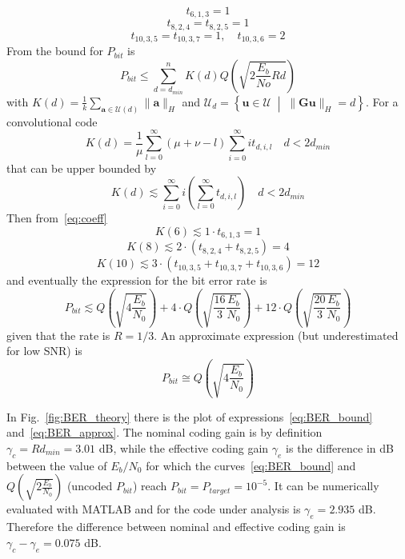 \documentclass[10pt]{article}
\begin{document}
\begin{equation*}
	t_{6,1,3} = 1
\end{equation*}
\begin{equation}\label{eq:coeff}
	t_{8,2,4} = t_{8,2,5} = 1
\end{equation}
\begin{equation*}
	t_{10, 3, 5} = t_{10, 3, 7} = 1, \quad  t_{10,3,6} = 2
\end{equation*}
From \cite{erseghe} the bound for $P_{bit}$ is
\begin{equation}
	P_{bit} \le \sum_{d=d_{min}}^n K(d)Q\left(\sqrt{2\frac{E_b}{No}Rd}\right)
\end{equation}
with $K(d) = \frac{1}{k} \sum_{\mathbf{a}\in\mathcal{U}(d)} \|\mathbf{a}\|_H$ and $\mathcal{U}_d = \left\{ \mathbf{u} \in \mathcal{U} \; \middle| \; \|\mathbf{Gu} \|_{H} = d \right\}$. For a convolutional code 
\begin{equation}
	K(d) = \frac{1}{\mu}\sum_{l=0}^{\infty} (\mu + \nu - l) \sum_{i=0}^{\infty} i t_{d,i,l} \quad d < 2d_{min}
\end{equation}
that can be upper bounded by
\begin{equation}
	K(d) \lesssim \sum_{i=0}^{\infty} i \left( \sum_{l=0}^{\infty}t_{d,i,l}\right) \quad d < 2d_{min}
\end{equation}
Then from~\eqref{eq:coeff} 
\begin{equation*}
	K(6) \lesssim 1\cdot t_{6,1,3} = 1
\end{equation*}
\begin{equation}
	K(8) \lesssim 2\cdot (t_{8,2,4} + t_{8,2,5}) = 4
\end{equation}
\begin{equation*}
	K(10) \lesssim 3\cdot (t_{10, 3, 5} + t_{10, 3, 7} + t_{10,3,6}) = 12
\end{equation*}
and eventually the expression for the bit error rate is
\begin{equation}\label{eq:BER_bound}
	P_{bit} \lesssim Q\left(\sqrt{4\frac{E_b}{N_0}} \right) + 4\cdot Q\left(\sqrt{\frac{16}{3}\frac{E_b}{N_0}} \right) + 12 \cdot Q\left(\sqrt{\frac{20}{3}\frac{E_b}{N_0}} \right)
\end{equation}
given that the rate is $R=1/3$. An approximate expression (but underestimated for low SNR) is
\begin{equation}\label{eq:BER_approx}
	P_{bit} \cong Q\left(\sqrt{4\frac{E_b}{N_0}} \right)
\end{equation}

In Fig.~\ref{fig:BER_theory} there is the plot of expressions~\eqref{eq:BER_bound} and~\eqref{eq:BER_approx}. The nominal coding gain is by definition $\gamma_c = Rd_{min} = 3.01$ dB, while the effective coding gain $\gamma_e$ is the difference in dB between the value of $E_b/N_0$ for which the curves~\eqref{eq:BER_bound} and $Q\left(\sqrt{2\frac{E_b}{N_0}}\right)$ (uncoded $P_{bit}$) reach $P_{bit} = P_{target} = 10^{-5}$. It can be numerically evaluated with MATLAB and for the code under analysis is $\gamma_e = 2.935$ dB. Therefore the difference between nominal and effective coding gain is $\gamma_c - \gamma_e = 0.075$ dB.
\end{document}
